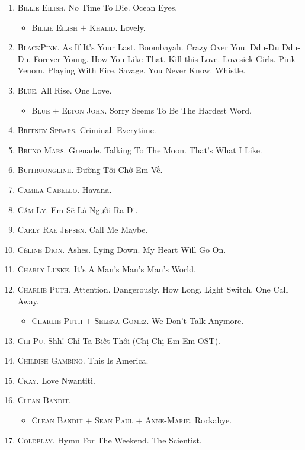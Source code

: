 \documentclass{article}
\numberwithin{equation}{section}
\begin{document}
\begin{enumerate}
	\item \textsc{Billie Eilish.} No Time To Die. Ocean Eyes.
	\begin{itemize}
		\item \textsc{Billie Eilish $+$ Khalid.} Lovely.
	\end{itemize}
	\item \textsc{BlackPink.} As If It's Your Last. Boombayah. Crazy Over You. Ddu-Du Ddu-Du. Forever Young. How You Like That. Kill this Love. Lovesick Girls. Pink Venom. Playing With Fire. Savage. You Never Know. Whistle.
	\item \textsc{Blue.} All Rise. One Love.
	\begin{itemize}
		\item \textsc{Blue $+$ Elton John.} Sorry Seems To Be The Hardest Word.
	\end{itemize}
	\item \textsc{Britney Spears.} Criminal. Everytime.
	\item \textsc{Bruno Mars.} Grenade. Talking To The Moon. That's What I Like.
	\item \textsc{Buitruonglinh.} Đường Tôi Chở Em Về.
	\item \textsc{Camila Cabello.} Havana.
	\item \textsc{Cẩm Ly.} Em Sẽ Là Người Ra Đi.
	\item \textsc{Carly Rae Jepsen.} Call Me Maybe.
	\item \textsc{C\'eline Dion.} Ashes. Lying Down. My Heart Will Go On.
	\item \textsc{Charly Luske.} It's A Man's Man's Man's World.
	\item \textsc{Charlie Puth.} Attention. Dangerously. How Long. Light Switch. One Call Away.
	\begin{itemize}
		\item \textsc{Charlie Puth $+$ Selena Gomez.} We Don't Talk Anymore.
	\end{itemize}
	\item \textsc{Chi Pu.} Shh! Chỉ Ta Biết Thôi (Chị Chị Em Em OST).
	\item \textsc{Childish Gambino.} This Is America.
	\item \textsc{Ckay.} Love Nwantiti.
	\item \textsc{Clean Bandit.}
	\begin{itemize}
		\item \textsc{Clean Bandit $+$ Sean Paul $+$ Anne-Marie.} Rockabye.
	\end{itemize}
	\item \textsc{Coldplay.} Hymn For The Weekend. The Scientist.

\end{enumerate}
\end{document}
